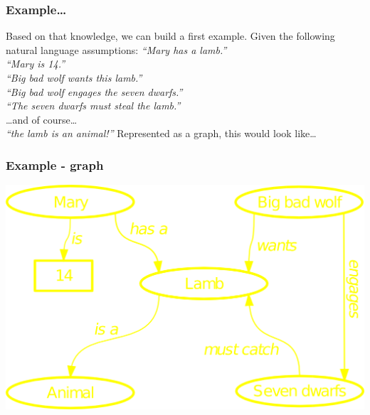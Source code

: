\documentclass{beamer}
\begin{document}
        \begin{frame}
            \frametitle{Example\ldots}

            Based on that knowledge, we can build a first example.
            \vskip 0.3cm
            Given the following natural language assumptions:
            \pause
            \vskip 0.5cm
            \textit{``Mary has a lamb.''\\
            \pause
            \textit{``Mary is 14.''}\\
            \pause
            ``Big bad wolf wants this lamb.''\\
            \pause
            ``Big bad wolf engages the seven dwarfs.''\\
            \pause
            ``The seven dwarfs must steal the lamb.''\\}
            \pause
            \ldots and of course\ldots\\
            \pause
            \textit{``the lamb is an animal!''}
            \pause
            \vskip 0.5cm
            Represented as a graph, this would look like\ldots
        \end{frame}

        \begin{frame}
            \frametitle{Example - graph}

            \includegraphics[scale=0.7]{graph}
        \end{frame}
\end{document}
